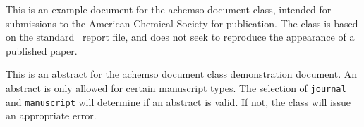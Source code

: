 This is an example document for the \textsf{achemso} document
class, intended for submissions to the American Chemical Society
for publication. The class is based on the standard \LaTeXe\
\textsf{report} file, and does not seek to reproduce the appearance
of a published paper.

This is an abstract for the \textsf{achemso} document class
demonstration document.  An abstract is only allowed for certain
manuscript types.  The selection of \texttt{journal} and
\texttt{manuscript} will determine if an abstract is valid.  If
not, the class will issue an appropriate error.